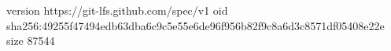 version https://git-lfs.github.com/spec/v1
oid sha256:49255f47494edb63dba6c9c5e55e6de96f956b82f9c8a6d3c8571df05408e22e
size 87544
